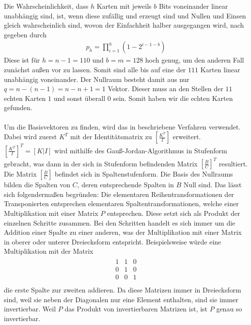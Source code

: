 \documentclass[a4paper,10pt,ngerman]{scrartcl}
\begin{document}
Die Wahrscheinlichkeit, dass $h$ Karten mit jeweils $b$ Bits voneinander linear unabhängig sind, ist, wenn diese zufällig und erzeugt sind und Nullen und Einsen gleich wahrscheinlich sind, wovon der Einfachheit halber ausgegangen wird, nach \cite{WEBSITE:1} gegeben durch
\begin{align*}
p_h = \prod^h_{i=1} (1-2^{i-1-b})
\end{align*}
Diese ist für $h=n-1=110$ und $b=m=128$ hoch genug, um den anderen Fall zunächst außen vor zu lassen. Somit sind alle bis auf eine der $111$ Karten linear unabhängig voneinander. Der Nullraum besteht damit aus nur $q=n-(n-1)=n-n+1=1$ Vektor. Dieser muss an den Stellen der $11$ echten Karten $1$ und sonst überall $0$ sein. Somit haben wir die echten Karten gefunden. \\\\
Um die Basisvektoren zu finden, wird das in \cite{WEBSITE:2} beschriebene Verfahren verwendet. Dabei wird zuerst $K^T$ mit der Identitätsmatrix zu $\left[\frac{K^T}{I}\right]$ erweitert. $\left[\frac{K^T}{I}\right]^T=[K|I]$ wird mithilfe des Gauß-Jordan-Algorithmus in Stufenform gebracht, was dann in der sich in Stufenform befindenden Matrix $\left[\frac{B}{C}\right]^T$ resultiert. Die Matrix $\left[\frac{B}{C}\right]$ befindet sich in Spaltenstufenform. Die Basis des Nullraums bilden die Spalten von $C$, deren entsprechende Spalten in $B$ Null sind. Das lässt sich folgendermaßen begründen: Die elementaren Reihentransformationen der Transponierten entsprechen elementaren Spaltentransformationen, welche einer Multiplikation mit einer Matrix $P$ entsprechen. Diese setzt sich als Produkt der einzelnen Schritte zusammen. Bei den Schritten handelt es sich immer um die Addition einer Spalte zu einer anderen, was der Multiplikation mit einer Matrix in oberer oder unterer Dreiecksform entspricht. Beispielsweise würde eine Multiplikation mit der Matrix
\begin{align*}
\begin{array}{ccc}
1 & 1 & 0 \\
0 & 1 & 0 \\
0 & 0 & 1 \\
\end{array}
\end{align*}
die erste Spalte zur zweiten addieren. Da diese Matrizen immer in Dreiecksform sind, weil sie neben der Diagonalen nur eine Element enthalten, sind sie immer invertierbar. Weil $P$ das Produkt von invertierbaren Matrizen ist, ist $P$ genau so invertierbar. \\
\end{document}
